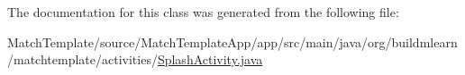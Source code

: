 The documentation for this class was generated from the following file\+:\begin{DoxyCompactItemize}
\item 
Match\+Template/source/\+Match\+Template\+App/app/src/main/java/org/buildmlearn/matchtemplate/activities/\hyperlink{MatchTemplate_2source_2MatchTemplateApp_2app_2src_2main_2java_2org_2buildmlearn_2matchtemplate_2c57a5baf8db48cc1ee3fbe7e03511d51}{Splash\+Activity.\+java}\end{DoxyCompactItemize}
